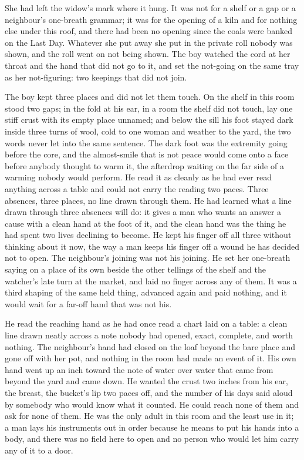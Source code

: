 She had left the widow's mark where it hung. It was not for a shelf or a gap or a neighbour's one-breath grammar; it was for the opening of a kiln and for nothing else under this roof, and there had been no opening since the coals were banked on the Last Day. Whatever she put away she put in the private roll nobody was shown, and the roll went on not being shown. The boy watched the cord at her throat and the hand that did not go to it, and set the not-going on the same tray as her not-figuring: two keepings that did not join.

The boy kept three places and did not let them touch. On the shelf in this room stood two gaps; in the fold at his ear, in a room the shelf did not touch, lay one stiff crust with its empty place unnamed; and below the sill his foot stayed dark inside three turns of wool, cold to one woman and weather to the yard, the two words never let into the same sentence. The dark foot was the extremity going before the core, and the almost-smile that is not peace would come onto a face before anybody thought to warm it, the afterdrop waiting on the far side of a warming nobody would perform. He read it as cleanly as he had ever read anything across a table and could not carry the reading two paces. Three absences, three places, no line drawn through them. He had learned what a line drawn through three absences will do: it gives a man who wants an answer a cause with a clean hand at the foot of it, and the clean hand was the thing he had spent two lives declining to become. He kept his finger off all three without thinking about it now, the way a man keeps his finger off a wound he has decided not to open. The neighbour's joining was not his joining. He set her one-breath saying on a place of its own beside the other tellings of the shelf and the watcher's late turn at the market, and laid no finger across any of them. It was a third shaping of the same held thing, advanced again and paid nothing, and it would wait for a far-off hand that was not his.

He read the reaching hand as he had once read a chart laid on a table: a clean line drawn neatly across a note nobody had opened, exact, complete, and worth nothing. The neighbour's hand had closed on the loaf beyond the bare place and gone off with her pot, and nothing in the room had made an event of it. His own hand went up an inch toward the note of water over water that came from  beyond the yard and came down. He wanted the crust two inches from his ear, the breast, the bucket's lip two paces off, and the number of his days said aloud by somebody who would know what it counted. He could reach none of them and ask for none of them. He was the only adult in this room and the least use in it; a man lays his instruments out in order because he means to put his hands into a body, and there was no field here to open and no person who would let him carry any of it to a door.

